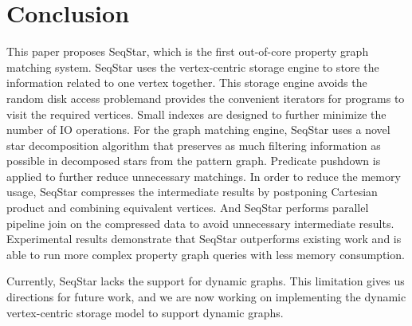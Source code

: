 \section{Conclusion}\label{sec:conclusion}
This paper proposes SeqStar, which is the first out-of-core property graph matching system.
SeqStar uses the vertex-centric storage engine to store the information related to one vertex together. 
This storage engine avoids the random disk access problemand provides the convenient iterators for programs to visit the required vertices.
Small indexes are designed to further minimize the number of IO operations.
For the graph matching engine,
SeqStar uses a novel star decomposition algorithm that preserves as much filtering information as possible in decomposed stars from the pattern graph.
Predicate pushdown is applied to further reduce unnecessary matchings.
In order to reduce the memory usage, SeqStar compresses the intermediate results by postponing Cartesian product and combining equivalent vertices.
And SeqStar performs parallel pipeline join on the compressed data to avoid unnecessary intermediate results.
Experimental results demonstrate that SeqStar outperforms existing work and is able to run more complex property graph queries with less memory consumption.


Currently, SeqStar lacks the support for dynamic graphs.
This limitation gives us directions for future work,
and we are now working on implementing the dynamic vertex-centric storage model to support dynamic graphs.
